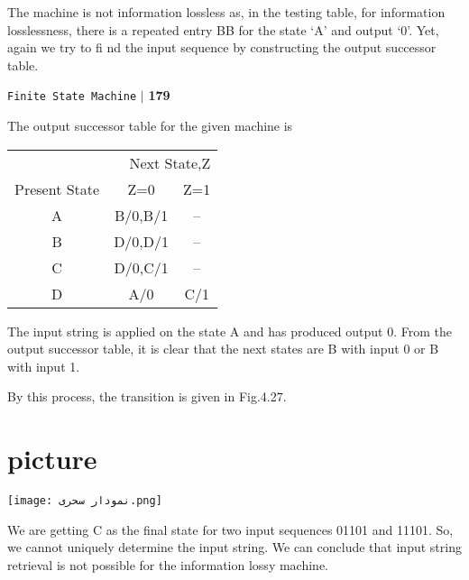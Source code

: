 \documentclass[a4]{article}
\begin{document}
 The machine is not information lossless as, in the testing table, for information losslessness, there
is a repeated entry BB for the state ‘A’ and output ‘0’. Yet, again we try to fi nd the input sequence by
constructing the output successor table.

\newpage
\begin{flushright}
\texttt{Finite State Machine} \hspace*{0.1cm}\textbf{$|$} \hspace*{0.1cm} \textbf{179}\hspace*{0.1cm}
\end{flushright}
\vspace*{1cm}

The output successor table for the given machine is


\begin{center}
\begin{tabular}{ccc}
\hline

\hline

\hline

\hline
  \multicolumn{3}{r}{{Next State,Z}}\\
 \cline{2-3}
{Present State} & {Z=0} & {Z=1}\\
\hline
 A & B/0,B/1 & -- \\
 B & D/0,D/1 & -- \\
 C & D/0,C/1 & -- \\
 D &  A/0    & C/1\\
\hline

\hline

\hline

\hline
\end{tabular}
\end{center}


The input string is applied on the state A and has produced output 0. From the output successor table, it is clear that the next states are B with input 0 or B with input 1.

By this process, the transition is given in Fig.4.27.

\section{picture}
\texttt{[image: نمودار  سحری.png]}


We are getting C as the final state for two input sequences 01101 and 11101. So, we cannot uniquely determine the input string. We can conclude that input string retrieval is not possible for the information lossy machine.
\end{document}
